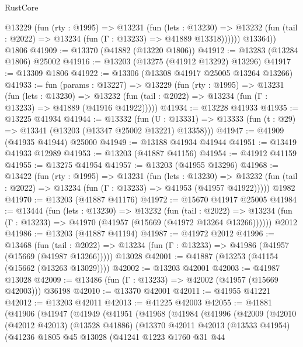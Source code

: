\begin{lexlean}{RustCore}
\begin{coremodule}
          @13229
            (fun (rty : @1995) =>
            @13231
              (fun (lets : @13230) =>
              @13232 (fun (tail : @2022) => @13234 (fun (Γ : @13233) => @41889 @13318))))))
        @13364))
    @1806
@41909 := @13370 (@41882 (@13220 @1806))
@41912 := @13283 (@13284 @1806) @25002
@41916 := @13203 (@13275 (@41912 @13292) @13296)
@41917 := @13309 @1806
@41922 := @13306 (@13308 @41917 @25005 @13264 @13266)
@41933 := fun (params : @13227) =>
  @13229
    (fun (rty : @1995) =>
    @13231
      (fun (lets : @13230) =>
      @13232 (fun (tail : @2022) => @13234 (fun (Γ : @13233) => @41889 (@41916 @41922)))))
@41934 := @13228 @41933
@41935 := @13225 @41934
@41944 := @13332
    (fun (U : @13331) => @13333 (fun (t : @29) => @13341 (@13203 (@13347 @25002 @13221) @13358)))
@41947 := @41909 (@41935 @41944) @25000
@41949 := @13188 @41934 @41944
@41951 := @13419 @41933 @12989
@41953 := @13203 (@41887 @41156)
@41954 := @41912 @41159
@41955 := @13275 @41954
@41957 := @13203 (@41955 @13296)
@41968 := @13422
    (fun (rty : @1995) =>
    @13231
      (fun (lets : @13230) =>
      @13232 (fun (tail : @2022) => @13234 (fun (Γ : @13233) => @41953 (@41957 @41922)))))
    @1982
@41970 := @13203 (@41887 @41176)
@41972 := @15670 @41917 @25005
@41984 := @13444
    (fun (lets : @13230) =>
    @13232
      (fun (tail : @2022) =>
      @13234 (fun (Γ : @13233) => @41970 (@41957 (@15669 (@41972 @13264 @13266))))))
    @2012
@41986 := @13203 (@41887 @41194)
@41987 := @41972 @2012
@41996 := @13468
    (fun (tail : @2022) => @13234 (fun (Γ : @13233) => @41986 (@41957 (@15669 (@41987 @13266)))))
    @13028
@42001 := @41887 (@13253 (@41154 (@15662 (@13263 @13029))))
@42002 := @13203 @42001
@42003 := @41987 @13028
@42009 := @13486 (fun (Γ : @13233) => @42002 (@41957 (@15669 @42003))) @36198
@42010 := @13370 @42001
@42011 := @41955 @41221
@42012 := @13203 @42011
@42013 := @41225 @42003
@42055 := @41881
    (@41906
      (@41947
        (@41949
          (@41951
            (@41968
              (@41984
                (@41996
                  (@42009
                    (@42010
                      (@42012 @42013)
                      (@13528 @41886)
                      (@13370
                        @42011
                        @42013
                        (@13533 @41954)
                        (@41236
                          @1805
                          @45
                          @13028
                          (@41241
                            @1223
                            @1760
                            @31
                            @44

\end{coremodule}
\end{lexlean}
